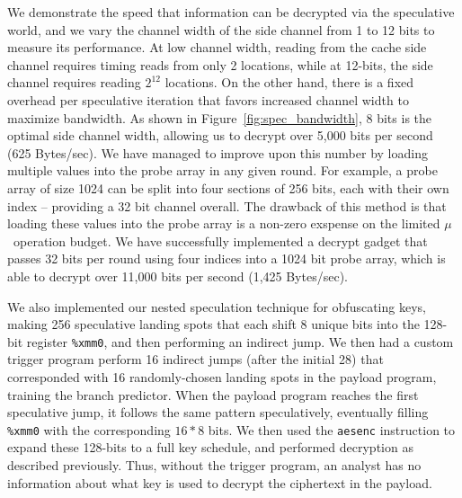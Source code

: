 We demonstrate the speed that information can be decrypted via the speculative
world, and we vary the channel width of the side channel from 1 to 12 bits to
measure its performance. At low channel width, reading from the cache side
channel requires timing reads from only 2 locations, while at 12-bits, the side
channel requires reading $2^{12}$ locations. On the other hand, there is a fixed
overhead per speculative iteration that favors increased channel width to
maximize bandwidth. As shown in Figure~\ref{fig:spec_bandwidth}, 8 bits is the
optimal side channel width, allowing us to decrypt over 5,000 bits per second
(625 Bytes/sec). We have managed to improve upon this number by loading multiple 
values into the probe array in any given round. For example, a probe array 
of size 1024 can be split into four sections of 256 bits, each with their 
own index -- providing a 32 bit channel overall. The drawback of this 
method is that loading these values into the probe array is a non-zero 
exspense on the limited $\mu$~operation budget. We have successfully 
implemented a decrypt gadget that passes 32 bits per round using four indices 
into a 1024 bit probe array, which is able to decrypt over 11,000 bits per second 
(1,425 Bytes/sec). 



\smallskip

We also implemented our nested speculation technique for obfuscating keys,
making 256 speculative landing spots that each shift 8 unique bits into the
128-bit register \texttt{\%xmm0}, and then performing an indirect jump. We then
had a custom trigger program perform 16 indirect jumps (after the initial 28)
that corresponded with 16 randomly-chosen landing spots in the payload program,
training the branch predictor. When the payload program reaches the first
speculative jump, it follows the same pattern speculatively, eventually filling
\texttt{\%xmm0} with the corresponding $16*8$ bits. We then used the
\texttt{aesenc} instruction to expand these 128-bits to a full key schedule, and
performed decryption as described previously. Thus, without the trigger program,
an analyst has no information about what key is used to decrypt the ciphertext
in the payload.





